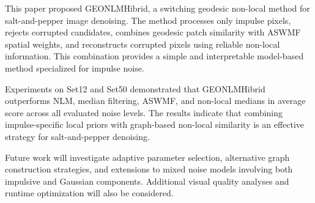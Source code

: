 \documentclass{ieeeaccess}
\begin{document}
This paper proposed GEONLMHibrid, a switching geodesic non-local method for salt-and-pepper image denoising. The method processes only impulse pixels, rejects corrupted candidates, combines geodesic patch similarity with ASWMF spatial weights, and reconstructs corrupted pixels using reliable non-local information. This combination provides a simple and interpretable model-based method specialized for impulse noise.

Experiments on Set12 and Set50 demonstrated that GEONLMHibrid outperforms NLM, median filtering, ASWMF, and non-local medians in average score across all evaluated noise levels. The results indicate that combining impulse-specific local priors with graph-based non-local similarity is an effective strategy for salt-and-pepper denoising.

Future work will investigate adaptive parameter selection, alternative graph construction strategies, and extensions to mixed noise models involving both impulsive and Gaussian components. Additional visual quality analyses and runtime optimization will also be considered.
\end{document}
